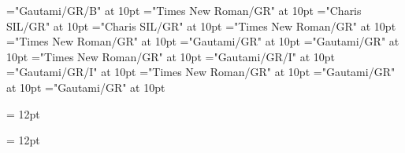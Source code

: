 \documentclass[c5paper,twoside]{article}
\begin{document}
\font\headwordggoTeluINentryletDatadicBody="Gautami/GR/B" at 10pt
\font\pronunciationsentryletDatadicBody="Times New Roman/GR" at 10pt
\font\pronunciationggofonipaxemicpronunciationsentryletDatadicBody="Charis SIL/GR" at 10pt
\font\spanggofonipaxemicpronunciationggofonipaxemicpronunciationsentryletDatadicBody="Charis SIL/GR" at 10pt
\font\sensesentryletDatadicBody="Times New Roman/GR" at 10pt
\font\sensesensesentryletDatadicBody="Times New Roman/GR" at 10pt
\font\LexSensepublishStemGlossPubLdtesensesensesentryletDatadicBody="Gautami/GR" at 10pt
\font\spanteLexSensepublishStemGlossPubLdtesensesensesentryletDatadicBody="Gautami/GR" at 10pt
\font\examplessensesensesentryletDatadicBody="Times New Roman/GR" at 10pt
\font\exampleggoTeluINexamplessensesensesentryletDatadicBody="Gautami/GR/I" at 10pt
\font\spanggoTeluINexampleggoTeluINexamplessensesensesentryletDatadicBody="Gautami/GR/I" at 10pt
\font\translationsexamplessensesensesentryletDatadicBody="Times New Roman/GR" at 10pt
\font\translationLdtetranslationsexamplessensesensesentryletDatadicBody="Gautami/GR" at 10pt
\font\spantetranslationLdtetranslationsexamplessensesensesentryletDatadicBody="Gautami/GR" at 10pt

\mbox{} 
\newpage 
\newpage 
\setcounter{page}{1} 
\pagestyle{fancy} 
\setlength{\columnsep}{12pt} 
\setlength\columnseprule{0.4pt} 
\begin{multicols}{2}{\raggedright} 
\hangindent= 12pt
\begin{center}\CmPicturepublishStemPileThumbnailPubpictureCaptionpictureRightentryletDatadicBody{}\end{center}

\headwordggoTeluINentryletDatadicBody{ }\pronunciationggofonipaxemicpronunciationsentryletDatadicBody{[}\pronunciationggofonipaxemicpronunciationsentryletDatadicBody{]}\pronunciationsentryletDatadicBody{ }

\hangindent= 12pt
\headwordggoTeluINentryletDatadicBody{ }\pronunciationggofonipaxemicpronunciationsentryletDatadicBody{[}\pronunciationggofonipaxemicpronunciationsentryletDatadicBody{]}\pronunciationsentryletDatadicBody{ }\LexSensepublishStemGlossPubLdtesensesensesentryletDatadicBody{ }\exampleggoTeluINexamplessensesensesentryletDatadicBody{ }\translationLdtetranslationsexamplessensesensesentryletDatadicBody{ }\examplessensesensesentryletDatadicBody{}\sensesentryletDatadicBody{}
 \end{multicols}
\end{document}
